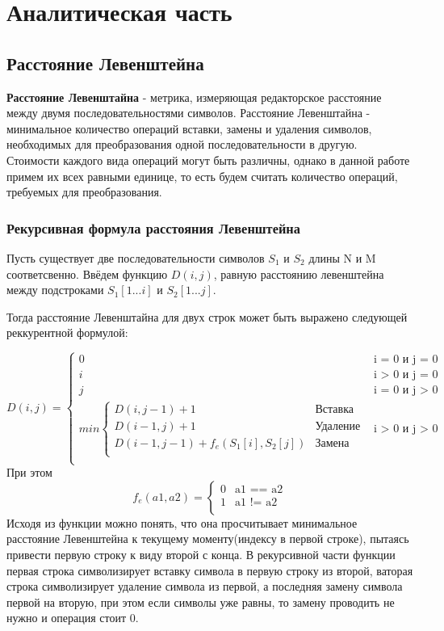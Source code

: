 \chapter{Аналитическая часть}
\section{Расстояние Левенштейна}
\textbf{Расстояние Левенштайна} - метрика, измеряющая редакторское расстояние между двумя последовательностями символов. Расстояние Левенштайна - минимальное количество операций вставки, замены и удаления символов, необходимых для преобразования одной последовательности в другую. Стоимости каждого вида операций могут быть различны, однако в данной работе примем их всех равными единице, то есть будем считать количество операций, требуемых для преобразования.

\subsection{Рекурсивная формула расстояния Левенштейна}

Пусть существует две последовательности символов $S_1$ и $S_2$ длины N и M соответсвенно. Ввёдем функцию $D(i, j)$, равную расстоянию левенштейна между подстроками $S_1[1...i]$ и $S_2[1...j]$.

Тогда расстояние Левенштайна для двух строк может быть выражено следующей реккурентной формулой:

\begin{equation}
	\label{eq:D}
	D(i, j) = 
	\begin{cases}
		0 &\text{i = 0 и j = 0}\\
		i &\text{i > 0 и j = 0}\\
		j &\text{i = 0 и j > 0}\\
		min \begin{cases}
			D(i, j - 1) + 1 &\text{Вставка}\\
			D(i - 1, j) + 1 &\text{Удаление}\\
			D(i - 1, j - 1) + f_e(S_1[i], S_2[j]) &\text{Замена}\\
		\end{cases} &\text{i > 0 и j > 0}\\
	\end{cases}
\end{equation}
При этом
\begin{equation}
	\label{eq:f_e}
	f_e(a1, a2) = 
	\begin{cases}
		0 &\text{a1 == a2}\\
		1 &\text{a1 != a2}\\
	\end{cases}
\end{equation}
Исходя из функции можно понять, что она просчитывает минимальное расстояние Левенштейна к текущему моменту(индексу в первой строке), пытаясь привести первую строку к виду второй с конца. В рекурсивной части функции первая строка символизирует вставку символа в первую строку из второй, ваторая строка символизирует удаление символа из первой, а последняя замену символа первой на вторую, при этом если символы уже равны, то замену проводить не нужно и операция стоит 0.

